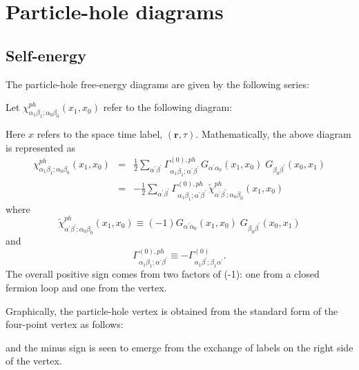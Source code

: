 \chapter{Particle-hole diagrams}
\label{chapter:particle-hole}

\section{Self-energy}
The particle-hole free-energy diagrams are given by
the following series:

\begin{center}
\end{center}

Let $\chi^{ph}_{\alpha_1 \beta_1; \alpha_0 \beta_0}(x_1,x_0)$ refer
to the following diagram:

\begin{center}
\end{center}

Here $x$ refers to the space time label, $(\mathbf{r},\tau)$.
Mathematically, the above diagram is represented as
\begin{eqnarray}
\label{k_ph}
\chi^{ph}_{\alpha_1 \beta_1; \alpha_0 \beta_0}(x_1,x_0) 
& = & \frac{1}{2} \sum_{\alpha^{\prime} \beta^{\prime}}
\Gamma^{(0),ph}_{\alpha_1\beta_1; \alpha^{\prime}\beta^{\prime}}\,
G_{\alpha^{\prime} \alpha_0}(x_1,x_0) \; G_{\beta_0 \beta^{\prime}}(x_0,x_1) \\
& = & -\frac{1}{2}\sum_{\alpha^{\prime} \beta^{\prime}} 
\Gamma^{(0),ph}_{\alpha_1\beta_1; \alpha^{\prime}\beta^{\prime}}\,
\tilde{\chi}^{ph}_{\alpha^{\prime} \beta^{\prime}; \alpha_0 \beta_0}(x_1,x_0)
\end{eqnarray}
where
\begin{equation}
\label{chi_ph}
\tilde{\chi}^{ph}_{\alpha^{\prime}\beta^{\prime}; 
\alpha_0 \beta_0}(x_1,x_0) \equiv
(-1) G_{\alpha^{\prime} \alpha_0}(x_1,x_0) \; 
G_{\beta_0 \beta^{\prime}}(x_0,x_1)
\end{equation}
and
\begin{equation}
\Gamma^{(0),ph}_{\alpha_1 \beta_1; \alpha^{\prime}\beta^{\prime}} \equiv
- \Gamma^{(0)}_{\alpha_1 \beta^{\prime}; \beta_1 \alpha^{\prime}}.
\end{equation}
The overall positive sign comes from two factors of (-1):
one from a closed fermion loop and one from the vertex.

Graphically, the particle-hole vertex is obtained from
the standard form of the four-point vertex 
as follows:
\begin{center}
\end{center}
and the minus sign is seen to emerge from the exchange of labels
on the right side of the vertex.

